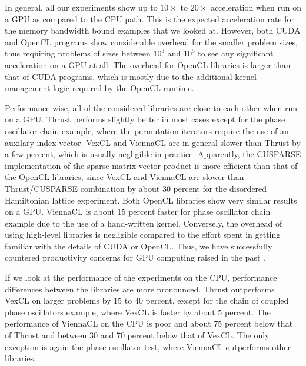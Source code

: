 \documentclass[final]{siamltex}
\begin{document}
In general, all our experiments show up to $10\times$ to $20\times$ acceleration
when run on a GPU as compared to the CPU path. This is the expected acceleration
rate for the memory bandwidth bound examples that we looked at. However, both CUDA and OpenCL
programs show considerable overhead for the smaller problem sizes,
thus requiring problems of sizes between $10^3$ and $10^5$ to see any significant acceleration on
a GPU at all. The overhead for OpenCL libraries is larger than that of CUDA programs,
which is mostly due to the additional kernel management logic required by the OpenCL runtime.

Performance-wise, all of the considered libraries are close to each other when
run on a GPU.  Thrust performs slightly better in most cases except for the phase oscillator chain example,
where the permutation iterators require the use of an auxilary index vector.
VexCL and ViennaCL are in general slower than Thrust by a few percent, which is usually negligible in practice.
Apparently, the CUSPARSE implementation of the sparse matrix-vector product is more efficient than that of the OpenCL
libraries, since VexCL and ViennaCL are slower than Thrust/CUSPARSE combination
by about 30 percent for the disordered Hamiltonian lattice experiment. Both
OpenCL libraries show very similar results on a GPU. ViennaCL is about 15 percent faster for
phase oscillator chain example due to the use of a hand-written kernel.
Conversely, the overhead of using high-level libraries is negligible compared to the effort spent in getting familiar with the details of CUDA or OpenCL.
Thus, we have successfully countered productivity concerns for GPU computing raised in the past \cite{bordawekar:gpu-productivity}.

If we look at the performance of the experiments on the CPU, performance
differences between the libraries are more pronounced. Thrust outperforms
VexCL on larger problems by 15 to 40 percent, except for the chain of coupled phase
oscillators example, where VexCL is faster by about 5 percent.
The performance of ViennaCL on the CPU is poor and about 75 percent below that of Thrust and between 30 and 70 percent below that of VexCL.
The only exception is again the phase oscillator test, where ViennaCL outperforms other libraries.
\end{document}
